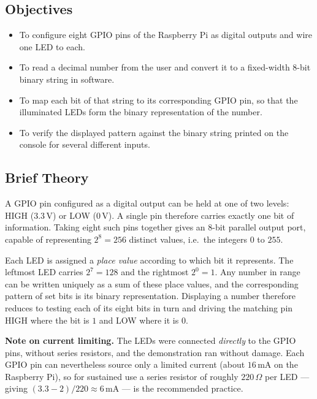 \documentclass[10pt,a4paper]{article}
\begin{document}
\subsection*{Objectives}
\begin{itemize}
  \item To configure eight GPIO pins of the Raspberry Pi as digital outputs and wire
        one LED to each.
  \item To read a decimal number from the user and convert it to a fixed-width 8-bit
        binary string in software.
  \item To map each bit of that string to its corresponding GPIO pin, so that the
        illuminated LEDs form the binary representation of the number.
  \item To verify the displayed pattern against the binary string printed on the
        console for several different inputs.
\end{itemize}

\subsection*{Brief Theory}
A GPIO pin configured as a digital output can be held at one of two levels: HIGH
($3.3\,\mathrm{V}$) or LOW ($0\,\mathrm{V}$). A single pin therefore carries exactly
one bit of information. Taking eight such pins together gives an 8-bit parallel output
port, capable of representing $2^{8} = 256$ distinct values, i.e.\ the integers
$0$ to $255$.

Each LED is assigned a \emph{place value} according to which bit it represents. The
leftmost LED carries $2^{7} = 128$ and the rightmost $2^{0} = 1$. Any number in range
can be written uniquely as a sum of these place values, and the corresponding pattern
of set bits is its binary representation. Displaying a number therefore reduces to
testing each of its eight bits in turn and driving the matching pin HIGH where the bit
is $1$ and LOW where it is $0$.

\begin{notebox}
\textbf{Note on current limiting.} The LEDs were connected \emph{directly} to the GPIO
pins, without series resistors, and the demonstration ran without damage. Each GPIO pin
can nevertheless source only a limited current (about $16\,\mathrm{mA}$ on the
Raspberry Pi), so for sustained use a series resistor of roughly $220\,\Omega$ per LED
--- giving $(3.3-2)/220 \approx 6\,\mathrm{mA}$ --- is the recommended practice.
\end{notebox}
\end{document}
